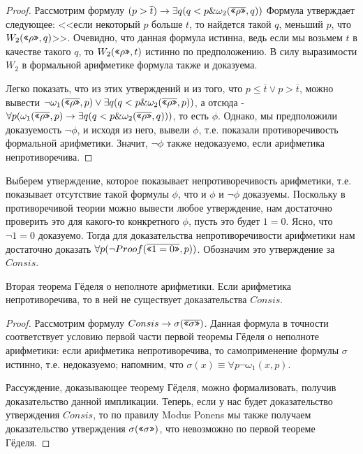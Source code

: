 \begin{proof}
Рассмотрим формулу $(p > \overline{t}) \rightarrow \exists q (q < p \& \omega_2 (\overline{\texttt{<<}\rho\texttt{>>}},q))$
Формула утверждает следующее: <<если некоторый $p$ больше $t$, то найдется
такой $q$, меньший $p$, что $W_2 (\texttt{<<}\rho\texttt{>>},q)$>>. Очевидно, что данная формула истинна,
ведь если мы возьмем $t$ в качестве такого $q$, то $W_2 (\texttt{<<}\rho\texttt{>>},t)$ истинно 
по предположению. В силу выразимости $W_2$ в формальной арифметике формула также и доказуема.

Легко показать, что из этих утверждений и из того, что $p \le \overline{t} \vee p > \overline{t}$,
можно вывести $\neg \omega_1 (\overline{\texttt{<<}\rho\texttt{>>}},p) \vee \exists q (q < p \& \omega_2 (\overline{\texttt{<<}\rho\texttt{>>}},p))$,
а отсюда - $\forall p (\omega_1 (\overline{\texttt{<<}\rho\texttt{>>}},p) \rightarrow \exists q (q < p \& \omega_2 (\overline{\texttt{<<}\rho\texttt{>>}},q)))$,
то есть $\phi$. Однако, мы предположили доказуемость $\neg \phi$, и исходя из него,
вывели $\phi$, т.е. показали противоречивость формальной арифметики. Значит, 
$\neg \phi$ также недоказуемо, если арифметика непротиворечива.
\end{proof}

Выберем утверждение, которое показывает непротиворечивость арифметики, т.е. 
показывает отсутствие такой формулы $\phi$, что и $\phi$ и $\neg \phi$ доказуемы.
Поскольку в противоречивой теории можно вывести любое утверждение, нам
достаточно проверить это для какого-то конкретного $\phi$, пусть это будет
$1=0$. Ясно, что $\neg 1=0$ доказуемо.
 Тогда для доказательства непротиворечивости арифметики нам достаточно
доказать $\forall p (\neg Proof (\overline{\texttt{<<}1=0\texttt{>>}}, p))$. Обозначим это утверждение
за $Consis$.

\begin{theorem}{Вторая теорема Гёделя о неполноте арифметики.}
Если арифметика непротиворечива, то в ней не существует доказательства $Consis$.
\end{theorem}

\begin{proof}
Рассмотрим формулу $Consis \rightarrow \sigma(\overline{\texttt{<<}\sigma\texttt{>>}})$.
Данная формула в точности соответствует условию первой части первой теоремы Гёделя 
о неполноте арифметики: 
если арифметика непротиворечива, то самоприменение формулы $\sigma$ истинно, т.е.
недоказуемо; напомним, что $\sigma(x) \equiv \forall p \neg \omega_1 (x,p)$.

Рассуждение, доказывающее теорему Гёделя, можно формализовать, получив доказательство
данной импликации. Теперь, если у нас будет доказательство утверждения $Consis$,
то по правилу Modus Ponens мы также получаем доказательство утверждения 
$\sigma (\texttt{<<}\sigma\texttt{>>})$, что невозможно по первой теореме Гёделя.
\end{proof}

